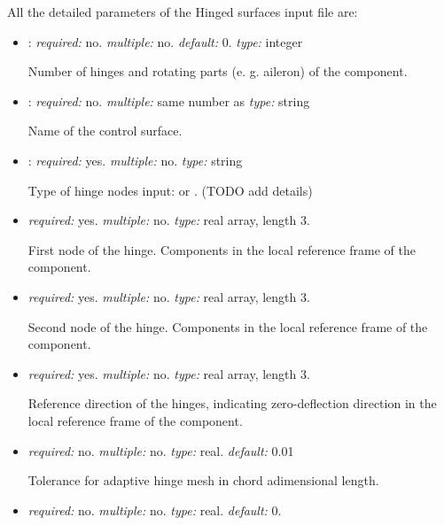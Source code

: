 All the detailed parameters of the Hinged surfaces input file are: 
\begin{itemize}
    \item {}: \textit{required:} no.  \textit{multiple:} no. \textit{default:} 0.
    \textit{type:} integer
    
    Number of hinges and rotating parts (e. g. aileron) of the component.
    
    \item {}: \textit{required:} no. \textit{multiple:} same number as  \textit{type:} string 
    
    Name of the control surface.
    
    \item {}: \textit{required:} yes. \textit{multiple:} no. \textit{type:} string
    
    Type of hinge nodes input:  or . (TODO add details)
    
    \item {} \textit{required:} yes. \textit{multiple:} no. \textit{type:} real array, length 3.
    
    First node of the hinge. Components in the local reference frame of the component.
    
    \item {} \textit{required:} yes. \textit{multiple:} no. \textit{type:} real array, length 3.
    
    Second node of the hinge. Components in the local reference frame of the component.
    
    \item {} \textit{required:} yes. \textit{multiple:} no. \textit{type:} real array, length 3. 
    
    Reference direction of the hinges, indicating zero-deflection direction in the local reference frame of the component.
    
    \item {} \textit{required:} no. \textit{multiple:} no. \textit{type:} real. \textit{default:} 0.01
    
    Tolerance for adaptive hinge mesh in chord adimensional length. 
    
    \item {} \textit{required:} no. \textit{multiple:} no. \textit{type:} real. \textit{default:} 0.
    

\end{itemize}

